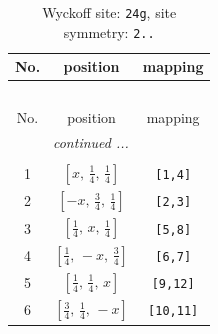 \documentclass[fleqn,8pt]{jsarticle}
\begin{document}
\renewcommand{\arraystretch}{1.2}
\begin{longtable}{ccc}
\caption{Wyckoff site: {\tt 24g}, site symmetry: {\tt 2..}}
 \\
 \hline \hline
No. & position & mapping \\ \hline \endfirsthead

\multicolumn{2}{l}{\tablename\ \thetable{}} \\
 \hline \hline
No. & position & mapping \\ \hline \endhead

 \hline \hline
\multicolumn{2}{r}{\footnotesize\it continued ...} \\ \endfoot

 \hline \hline
\multicolumn{2}{r}{} \\ \endlastfoot

1 & $\left[ x,\, \frac{1}{4},\, \frac{1}{4} \right]$ & {\tt [1,4]} \\ \hline
2 & $\left[ - x,\, \frac{3}{4},\, \frac{1}{4} \right]$ & {\tt [2,3]} \\ \hline
3 & $\left[ \frac{1}{4},\, x,\, \frac{1}{4} \right]$ & {\tt [5,8]} \\ \hline
4 & $\left[ \frac{1}{4},\, - x,\, \frac{3}{4} \right]$ & {\tt [6,7]} \\ \hline
5 & $\left[ \frac{1}{4},\, \frac{1}{4},\, x \right]$ & {\tt [9,12]} \\ \hline
6 & $\left[ \frac{3}{4},\, \frac{1}{4},\, - x \right]$ & {\tt [10,11]} \\
\end{longtable}
\renewcommand{\arraystretch}{1.2}
\end{document}
